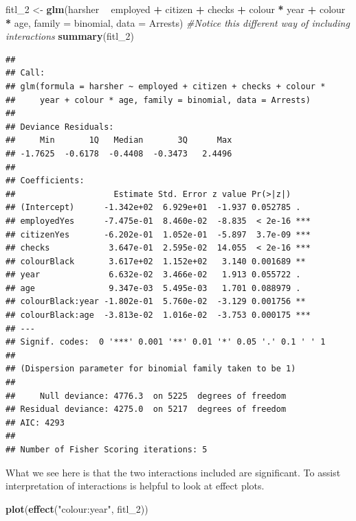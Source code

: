 \documentclass[]{book}
\newenvironment{Shaded}{\begin{snugshade}}{\end{snugshade}}
\newcommand{\CommentTok}[1]{\textcolor[rgb]{0.56,0.35,0.01}{\textit{#1}}}
\newcommand{\DataTypeTok}[1]{\textcolor[rgb]{0.13,0.29,0.53}{#1}}
\newcommand{\DecValTok}[1]{\textcolor[rgb]{0.00,0.00,0.81}{#1}}
\newcommand{\KeywordTok}[1]{\textcolor[rgb]{0.13,0.29,0.53}{\textbf{#1}}}
\newcommand{\NormalTok}[1]{#1}
\newcommand{\OperatorTok}[1]{\textcolor[rgb]{0.81,0.36,0.00}{\textbf{#1}}}
\newcommand{\StringTok}[1]{\textcolor[rgb]{0.31,0.60,0.02}{#1}}
\theoremstyle{definition}
\theoremstyle{definition}
\theoremstyle{definition}
\theoremstyle{remark}
\begin{document}
\begin{Shaded}
\begin{Highlighting}[]
\NormalTok{fitl_}\DecValTok{2}\NormalTok{ <-}\StringTok{ }\KeywordTok{glm}\NormalTok{(harsher }\OperatorTok{~}\StringTok{ }\NormalTok{employed }\OperatorTok{+}\StringTok{ }\NormalTok{citizen }\OperatorTok{+}\StringTok{ }\NormalTok{checks }\OperatorTok{+}\StringTok{ }\NormalTok{colour }\OperatorTok{*}\StringTok{ }\NormalTok{year }\OperatorTok{+}\StringTok{ }\NormalTok{colour }\OperatorTok{*}\StringTok{ }\NormalTok{age, }\DataTypeTok{family =}\NormalTok{ binomial, }\DataTypeTok{data =}\NormalTok{ Arrests) }\CommentTok{#Notice this different way of including interactions}
\KeywordTok{summary}\NormalTok{(fitl_}\DecValTok{2}\NormalTok{)}
\end{Highlighting}
\end{Shaded}

\begin{verbatim}
## 
## Call:
## glm(formula = harsher ~ employed + citizen + checks + colour * 
##     year + colour * age, family = binomial, data = Arrests)
## 
## Deviance Residuals: 
##     Min       1Q   Median       3Q      Max  
## -1.7625  -0.6178  -0.4408  -0.3473   2.4496  
## 
## Coefficients:
##                    Estimate Std. Error z value Pr(>|z|)    
## (Intercept)      -1.342e+02  6.929e+01  -1.937 0.052785 .  
## employedYes      -7.475e-01  8.460e-02  -8.835  < 2e-16 ***
## citizenYes       -6.202e-01  1.052e-01  -5.897  3.7e-09 ***
## checks            3.647e-01  2.595e-02  14.055  < 2e-16 ***
## colourBlack       3.617e+02  1.152e+02   3.140 0.001689 ** 
## year              6.632e-02  3.466e-02   1.913 0.055722 .  
## age               9.347e-03  5.495e-03   1.701 0.088979 .  
## colourBlack:year -1.802e-01  5.760e-02  -3.129 0.001756 ** 
## colourBlack:age  -3.813e-02  1.016e-02  -3.753 0.000175 ***
## ---
## Signif. codes:  0 '***' 0.001 '**' 0.01 '*' 0.05 '.' 0.1 ' ' 1
## 
## (Dispersion parameter for binomial family taken to be 1)
## 
##     Null deviance: 4776.3  on 5225  degrees of freedom
## Residual deviance: 4275.0  on 5217  degrees of freedom
## AIC: 4293
## 
## Number of Fisher Scoring iterations: 5
\end{verbatim}

What we see here is that the two interactions included are significant.
To assist interpretation of interactions is helpful to look at effect
plots.

\begin{Shaded}
\begin{Highlighting}[]
\KeywordTok{plot}\NormalTok{(}\KeywordTok{effect}\NormalTok{(}\StringTok{"colour:year"}\NormalTok{, fitl_}\DecValTok{2}\NormalTok{))}
\end{Highlighting}
\end{Shaded}
\end{document}
